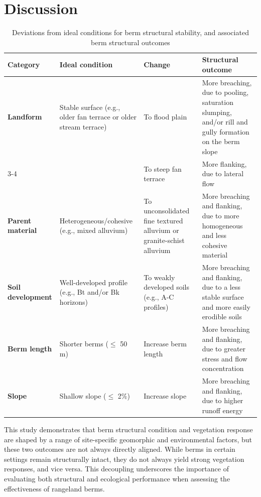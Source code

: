 \documentclass[review]{elsarticle}
\begin{document}
\section{Discussion}

\begin{table}[h!]
\centering
\caption{\normalsize Deviations from ideal conditions for berm structural stability, and associated berm structural outcomes}
\small
\begin{tabular}{|p{3 cm}|p{3.5cm}|p{3.5cm}|p{4cm}|}
\hline
\textbf{Category} & \textbf{Ideal condition} & \textbf{Change} & \textbf{Structural outcome } \\
\hline
\textbf{Landform} & Stable surface (e.g., older fan terrace or older stream terrace) & To flood plain & More breaching, due to pooling, saturation slumping, and/or rill and gully formation on the berm slope\\
\cline{3-4}
 & & To steep fan terrace & More flanking, due to lateral flow \\
\hline
\textbf{Parent material} & Heterogeneous/cohesive (e.g., mixed alluvium) & To unconsolidated fine textured alluvium or granite-schist alluvium & More breaching and flanking, due to more homogeneous and less cohesive material \\
\hline
\textbf{Soil development} & Well-developed profile (e.g., Bt and/or Bk horizons) & To weakly developed soils (e.g., A-C profiles) & More breaching and flanking, due to a less stable surface and more easily erodible soils \\
\hline
\textbf{Berm length} & Shorter berms ($\leq$ 50 m) & Increase berm length & More breaching and flanking, due to greater stress and flow concentration \\
\hline
\textbf{Slope} & Shallow slope ($\leq$ 2\%) & Increase slope & More breaching and flanking, due to higher runoff energy \\
\hline
\end{tabular}
\label{tab:berm_outcomes}
\end{table}

This study demonstrates that berm structural condition and vegetation response are shaped by a range of site-specific geomorphic and environmental factors, but these two outcomes are not always directly aligned. While berms in certain settings remain structurally intact, they do not always yield strong vegetation responses, and vice versa. This decoupling underscores the importance of evaluating both structural and ecological performance when assessing the effectiveness of rangeland berms.
\end{document}
